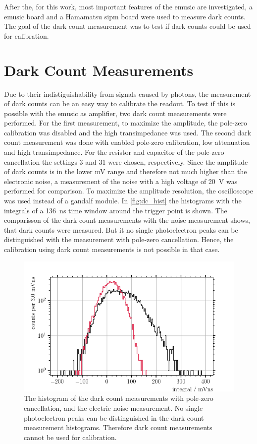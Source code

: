 After the, for this work, most important features of the \ac{emusic} are investigated, a \ac{emusic} board and a Hamamatsu \ac{sipm} board were used to measure dark counts.
The goal of the dark count measurement was to test if dark counts could be used for calibration.

\section{Dark Count Measurements}
Due to their indistiguishability from signals caused by photons, the measurement of dark counts can be an easy way to calibrate the readout.
To test if this is possible with the \ac{emusic} as amplifier, two dark count measurements were performed.
For the first measurement, to maximize the amplitude, the pole-zero calibration was disabled and the high transimpedance was used.
The second dark count measurement was done with enabled pole-zero calibration, low attenuation and high transimpedance.
For the resistor and capacitor of the pole-zero cancellation the settings 3 and 31 were chosen, respectively.
Since the amplitude of dark counts is in the lower \si{\milli\volt} range and therefore not much higher than the electronic noise, a measurement of the noise with a high voltage of \SI{20}{\volt} was performed for comparison.
To maximize the amplitude resolution, the oscilloscope was used instead of a \ac{gandalf} module.
In \autoref{fig:dc_hist} the histograms with the integrals of a \SI{136}{\nano\second} time window around the trigger point is shown. 
The comparisson of the dark count measurements with the noise measurement shows, that dark counts were measured.
But it no single photoelectron peaks can be distinguished with the measurement with pole-zero cancellation.
Hence, the calibration using dark count measurements is not possible in that case.
\begin{figure}
	\centering
	\includegraphics[width=1.\textwidth]{pictures/dc_hist_pz}
	\caption[Histogram of the dark count measurements with pole-zero cancellation.]{The histogram of the dark count measurements with pole-zero cancellation, and the electric noise measurement. No single photoelectron peaks can be distinguished in the dark count measurement histograms. Therefore dark count measurements cannot be used for calibration.} 
	\label{fig:dc_hist}
\end{figure}
